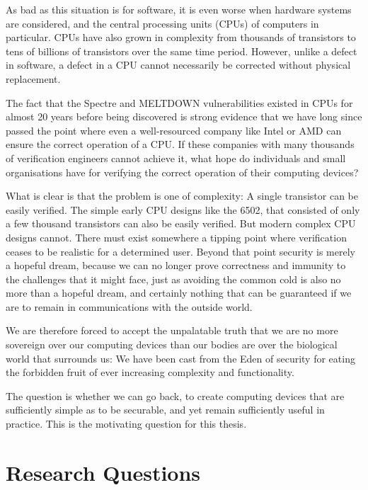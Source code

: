 As bad as this situation is for software, it is even worse when hardware systems are considered, and the central processing units
(CPUs) of computers in particular.  
CPUs have also grown in complexity from thousands of transistors to tens of billions of transistors over the same time period.  
However, unlike a defect in software, a defect in a CPU cannot necessarily be corrected without physical replacement.

The fact that the Spectre and MELTDOWN vulnerabilities existed in CPUs for almost 20 years before being discovered \cite{Spectacular}
is strong evidence that we have long since passed the point where even a well-resourced company like Intel or AMD can ensure
the correct operation of a CPU.  
If these companies with many thousands of verification engineers cannot achieve it, what hope do individuals and small organisations have for verifying the correct operation of their computing devices?

What is clear is that the problem is one of complexity: A single transistor can be easily verified. The simple early CPU designs
like the 6502, that consisted of only a few thousand transistors can also be easily verified.  But modern complex CPU designs cannot.
There must exist somewhere a tipping point where verification ceases to be realistic for a determined user.
Beyond that point security is merely a hopeful dream, because we can no longer prove correctness and immunity to the challenges
that it might face, just as avoiding the common cold is also no more than a hopeful dream, and certainly nothing that can
be guaranteed if we are to remain in communications with the outside world.

We are therefore forced to accept the unpalatable truth that we are no more sovereign over our computing devices than our bodies
are over the biological world that surrounds us: We have been cast from the Eden of security for eating the forbidden fruit of
ever increasing complexity and functionality.

The question is whether we can go back, to create computing devices that are sufficiently simple as to be securable, and yet
remain sufficiently useful in practice.  This is the motivating question for this thesis.

\section{Research Questions}

\label{Ch1 Sec2}

